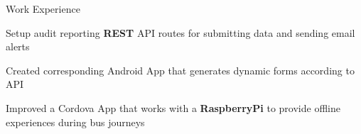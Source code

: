 \documentclass[UKenglish]{resume} %
\begin{document}
\begin{rSection}{Work Experience}
\begin{rSubsection}
        \item Setup audit reporting \textbf{REST} API routes for submitting data and sending email alerts
        \item Created corresponding Android App that generates dynamic forms according to API
        \item Improved a Cordova App that works with a \textbf{RaspberryPi} to provide offline experiences during bus journeys
    \end{rSubsection}

\end{rSection}

\end{document}
